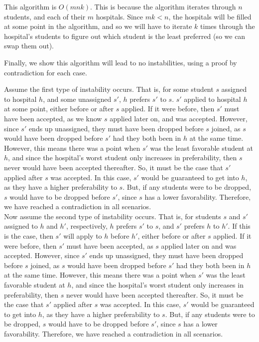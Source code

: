 \documentclass[12pt]{article}
\begin{document}
This algorithm is $O(mnk)$. This is because the algorithm iterates through $n$ students, and each of their $m$ hospitals. Since $mk < n$, the hospitals will be filled at some point in the algorithm, and so we will have to iterate $k$ times through the hospital's students to figure out which student is the least preferred (so we can swap them out).

Finally, we show this algorithm will lead to no instabilities, using a proof by contradiction for each case.

Assume the first type of instability occurs. That is, for some student $s$ assigned to hospital $h$, and some unassigned $s'$, $h$ prefers $s'$ to $s$. $s'$ applied to hospital $h$ at some point, either before or after $s$ applied. If it were before, then $s'$ must have been accepted, as we know $s$ applied later on, and was accepted. However, since $s'$ ends up unassigned, they must have been dropped before $s$ joined, as $s$ would have been dropped before $s'$ had they both been in $h$ at the same time. However, this means there was a point when $s'$ was the least favorable student at $h$, and since the hospital's worst student only increases in preferability, then $s$ never would have been accepted thereafter. So, it must be the case that $s'$ applied after $s$ was accepted. In this case, $s'$ would be guaranteed to get into $h$, as they have a higher preferability to $s$. But, if any students were to be dropped, $s$ would have to be dropped before $s'$, since $s$ has a lower favorability. Therefore, we have reached a contradiction in all scenarios.\\

Now assume the second type of instability occurs. That is, for students $s$ and $s'$ assigned to $h$ and $h'$, respectively, $h$ prefers $s'$ to $s$, and $s'$ prefers $h$ to $h'$. If this is the case, then $s'$ will apply to $h$ before $h'$, either before or after $s$ applied. If it were before, then $s'$ must have been accepted, as $s$ applied later on and was accepted. However, since $s'$ ends up unassigned, they must have been dropped before $s$ joined, as $s$ would have been dropped before $s'$ had they both been in $h$ at the same time. However, this means there was a point when $s'$ was the least favorable student at $h$, and since the hospital's worst student only increases in preferability, then $s$ never would have been accepted thereafter. So, it must be the case that $s'$ applied after $s$ was accepted. In this case, $s'$ would be guaranteed to get into $h$, as they have a higher preferability to $s$. But, if any students were to be dropped, $s$ would have to be dropped before $s'$, since $s$ has a lower favorability. Therefore, we have reached a contradiction in all scenarios.\\
\end{document}
